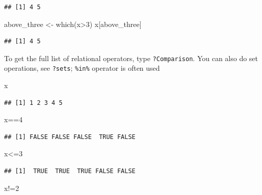 \documentclass[
]{book}
\newenvironment{Shaded}{\begin{snugshade}}{\end{snugshade}}
\newcommand{\DecValTok}[1]{\textcolor[rgb]{0.00,0.00,0.81}{#1}}
\newcommand{\FunctionTok}[1]{\textcolor[rgb]{0.00,0.00,0.00}{#1}}
\newcommand{\NormalTok}[1]{#1}
\newcommand{\OtherTok}[1]{\textcolor[rgb]{0.56,0.35,0.01}{#1}}
\newcommand{\SpecialCharTok}[1]{\textcolor[rgb]{0.00,0.00,0.00}{#1}}
\begin{document}
\begin{verbatim}
## [1] 4 5
\end{verbatim}

\begin{Shaded}
\begin{Highlighting}[]
\NormalTok{above\_three }\OtherTok{\textless{}{-}} \FunctionTok{which}\NormalTok{(x}\SpecialCharTok{\textgreater{}}\DecValTok{3}\NormalTok{)}
\NormalTok{x[above\_three]}
\end{Highlighting}
\end{Shaded}

\begin{verbatim}
## [1] 4 5
\end{verbatim}

To get the full list of relational operators, type \texttt{?Comparison}. You can also do set operations, see \texttt{?sets}; \texttt{\%in\%} operator is often used

\begin{Shaded}
\begin{Highlighting}[]
\NormalTok{x}
\end{Highlighting}
\end{Shaded}

\begin{verbatim}
## [1] 1 2 3 4 5
\end{verbatim}

\begin{Shaded}
\begin{Highlighting}[]
\NormalTok{x}\SpecialCharTok{==}\DecValTok{4}
\end{Highlighting}
\end{Shaded}

\begin{verbatim}
## [1] FALSE FALSE FALSE  TRUE FALSE
\end{verbatim}

\begin{Shaded}
\begin{Highlighting}[]
\NormalTok{x}\SpecialCharTok{\textless{}=}\DecValTok{3}
\end{Highlighting}
\end{Shaded}

\begin{verbatim}
## [1]  TRUE  TRUE  TRUE FALSE FALSE
\end{verbatim}

\begin{Shaded}
\begin{Highlighting}[]
\NormalTok{x}\SpecialCharTok{!=}\DecValTok{2}
\end{Highlighting}
\end{Shaded}
\end{document}
